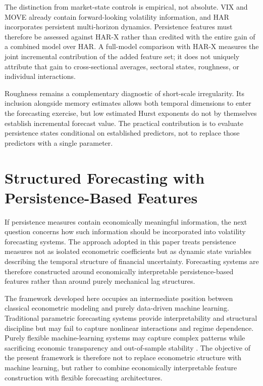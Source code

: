 \documentclass[jrfm,article,submit,moreauthors,pdftex]{Definitions/mdpi}
\begin{document}
The distinction from market-state controls is empirical, not absolute.
VIX and MOVE already contain forward-looking volatility information, and
HAR incorporates persistent multi-horizon dynamics. Persistence features
must therefore be assessed against HAR-X rather than credited with the
entire gain of a combined model over HAR. A full-model comparison with
HAR-X measures the joint incremental contribution of the added feature
set; it does not uniquely attribute that gain to cross-sectional averages,
sectoral states, roughness, or individual interactions.

Roughness remains a complementary diagnostic of short-scale irregularity.
Its inclusion alongside memory estimates allows both temporal dimensions
to enter the forecasting exercise, but low estimated Hurst exponents do not
by themselves establish incremental forecast value. The practical
contribution is to evaluate persistence states conditional on established
predictors, not to replace those predictors with a single parameter.

\section{Structured Forecasting with Persistence-Based Features}
\label{sec:ml}

If persistence measures contain economically meaningful information, the
next question concerns how such information should be incorporated into
volatility forecasting systems. The approach adopted in this paper treats
persistence measures not as isolated econometric coefficients but as dynamic
state variables describing the temporal structure of financial uncertainty.
Forecasting systems are therefore constructed around economically
interpretable persistence-based features rather than around purely
mechanical lag structures.

The framework developed here occupies an intermediate position between
classical econometric modeling and purely data-driven machine learning.
Traditional parametric forecasting systems provide interpretability and
structural discipline but may fail to capture nonlinear interactions and
regime dependence. Purely flexible machine-learning systems may capture
complex patterns while sacrificing economic transparency and out-of-sample
stability \citep{gu2020empirical}. The objective of the present framework
is therefore not to replace econometric structure with machine learning,
but rather to combine economically interpretable feature construction with
flexible forecasting architectures.
\end{document}
